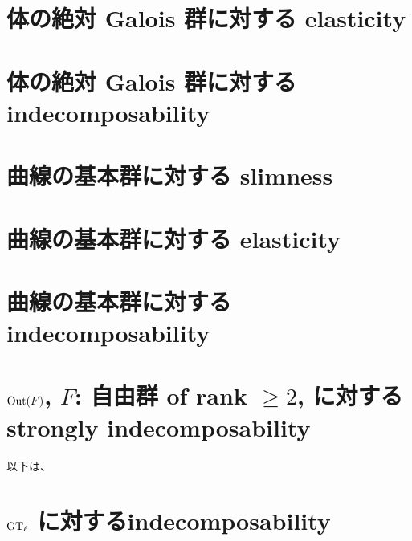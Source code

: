 \section{体の絶対 Galois 群に対する elasticity}

\section{体の絶対 Galois 群に対する indecomposability}

\section{曲線の基本群に対する slimness}

\section{曲線の基本群に対する elasticity}

\section{曲線の基本群に対する indecomposability}

\section{$\mathrm{Out}(F)$, $F$: 自由群 of rank $ \geq 2$, に対する strongly indecomposability}

以下は、

\section{$\mathrm{GT}_\ell$ に対するindecomposability}